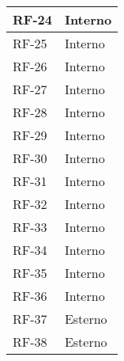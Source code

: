 \begin{longtable}{|>{\centering\arraybackslash}m{}|>{\centering\arraybackslash}m{}|}
	RF-24           & Interno                                                                                                           \\\hline
	RF-25           & Interno                                                                                                           \\\hline
	RF-26           & Interno                                                                                                           \\\hline
	RF-27           & Interno                                                                                                           \\\hline
	RF-28           & Interno                                                                                                           \\\hline
	RF-29           & Interno                                                                                                           \\\hline
	RF-30           & Interno                                                                                                           \\\hline
	RF-31           & Interno                                                                                                           \\\hline
	RF-32           & Interno                                                                                                           \\\hline
	RF-33           & Interno                                                                                                           \\\hline
	RF-34           & Interno                                                                                                           \\\hline
	RF-35           & Interno                                                                                                           \\\hline
	RF-36           & Interno                                                                                                           \\\hline
	RF-37           & Esterno                                                                                                           \\\hline
	RF-38           & Esterno                                                                                                           \\\hline

\end{longtable}
